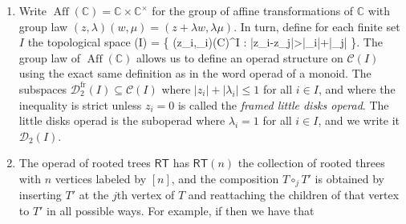 \documentclass[fleqn,a4paper, twoside]{article}
\makeatletter
\newcommand{\0}{\langle 0\rangle}
\newenvironment{tenumerate}{
 \begin{enumerate}
  \setlength{\itemsep}{0pt}
  \setlength{\parskip}{0pt}
}{\end{enumerate}}
\let\[\@undefined
\DeclareRobustCommand{\[}{\begin{equation}}%
\let\]\@undefined
\DeclareRobustCommand{\]}{\end{equation}}%
\theoremstyle{mytheorem}
\theoremstyle{introthm}
\theoremstyle{mydefinition}
\theoremstyle{mydefinition2}
\theoremstyle{plain} %
\newcommand{\?}{\,?\,}
\theoremstyle{mytheorem}
\theoremstyle{plain} %
\makeatother
\begin{document}
\begin{tenumerate}
 \item Write $\operatorname{Aff}(\mathbb C) = \mathbb{C}\times \mathbb{C}^\times$ for the group of affine transformations of
$\mathbb C$ with group law $(z,\lambda)(w,\mu) = (z+\lambda w,\lambda\mu)$. In turn, define for each finite set $I$ the topological space
\[ (I) = \{ (z_i,\lambda_i)\in {}(\mathbb C)^I  : |z_i-z_j|>|\lambda_i|+|\lambda_j| \}.\] 
The group law of $\operatorname{Aff}(\mathbb C)$ allows us to
define an operad structure on $\mathcal{C}(I)$ using the
exact same definition as in the word operad of a monoid. 
The subspaces $\mathcal{D}_2^{\mathrm{fr}}(I)
	\subseteq \mathcal{C}(I)$
where $|z_i|+|\lambda_i|\leqslant 1$ for all $i\in I$, and 
where the inequality is strict unless $z_i=0$ is called
the \emph{framed little disks operad}. The little disks operad
is the suboperad where $\lambda_i = 1$ for all $i\in I$, and 
we write it $\mathcal{D}_2(I)$.

 \item The operad of rooted trees $\mathsf{RT}$ has
 $\mathsf{RT}(n)$ the collection of rooted threes with $n$
 vertices labeled by $[n]$, and the composition $T \circ_j T'$
  is obtained by inserting $T'$ at the $j$th vertex of $T$
  and reattaching the children of that vertex to $T'$ in
  all possible ways. For example, if
then we have that  
\end{tenumerate}
\end{document}
